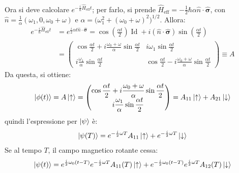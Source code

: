 \documentclass[11pt, a4paper]{scrartcl} %
\numberwithin{equation}{subsection}
\theoremstyle{style2}
\theoremstyle{style1}
\begin{document}
Ora si deve calcolare $e^{ - \frac{i}{\hbar }\hat{H}_\text{eff}t} $; per farlo, si prende $\hat{H}_\text{eff} = -\frac{1}{2} \hbar  \alpha  \hat{n}\cdot \hat{\pmb{\sigma } }$, con $\hat{n} = \frac{1}{\alpha } (\omega_1 , 0 , \omega_0 + \omega)$ e $\alpha  = \big( \omega_1 ^2 + (\omega_0 +\omega)^2\big)^{1 / 2} $. Allora:
\begin{equation}
	\begin{split}
		e^{- \frac{i}{\hbar } \hat{H}_\text{eff}t } &= e^{\frac{i}{2} \alpha  t \hat{n}\cdot \hat{\pmb{\sigma } }} = \cos \left(\frac{\alpha  t  }{2}\right)  \operatorname{Id} + i (\hat{n}\cdot \hat{\pmb{\sigma } }) \sin \left(\frac{\alpha  t }{2}\right) \\
							    &= \begin{pmatrix} \displaystyle \cos \frac{\alpha t}{2} + i \frac{\omega_0 +\omega}{\alpha } \sin \frac{\alpha  t}{2} & \displaystyle i \omega_1 \sin \frac{\alpha  t}{2}\\ & \\\displaystyle i \frac{\omega_1}{\alpha } \sin \frac{\alpha  t }{2} & \displaystyle \cos \frac{\alpha  t}{2} - i \frac{\omega_0 + \omega}{\alpha }\sin \frac{\alpha  t }{2}  \end{pmatrix} \equiv A
	\end{split}
\end{equation}
Da questa, si ottiene:
\begin{equation}
	\ket{\phi (t)} = A \ket{\uparrow} = \begin{pmatrix} \displaystyle \cos \frac{\alpha  t }{2} + i \frac{\omega_0 + \omega }{\alpha } \sin \frac{\alpha  t  }{2} \\ \displaystyle i \frac{\omega_1}{\alpha } \sin \frac{\alpha  t }{2} \end{pmatrix} = A_{11} \ket{\uparrow} + A_{21} \ket{\downarrow} 
\end{equation}
quindi l'espressione per $\ket{\psi } $ \`e:
\begin{equation}
	\ket{\psi (T)} = e^{-\frac{i}{2}\omega T} A_{11} \ket{\uparrow} + e^{- \frac{i}{2}\omega T} \ket{\downarrow} 
\end{equation}
Se al tempo $T$, il campo magnetico rotante cessa:
\begin{equation}
	\ket{\psi (t)} = e^{\frac{i}{2}\omega_0 (t-T)} e^{-\frac{i}{2}\omega T} A_{11} (T) \ket{\uparrow} + e^{-\frac{i}{2}\omega_0(t-T)} e^{ \frac{i}{2}\omega T} A_{12}(T) \ket{\downarrow} 
\end{equation}
\end{document}

